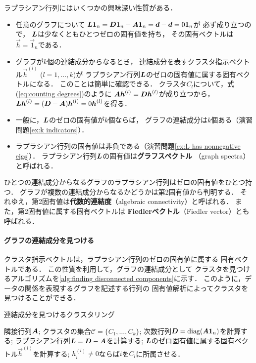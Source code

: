 ラプラシアン行列にはいくつかの興味深い性質がある．
\begin{itemize}
\item
任意のグラフについて
$\mbox{\boldmath $L$}\mbox{\boldmath $1$}_n=\mbox{\boldmath $D$}\mbox{\boldmath $1$}_n-\mbox{\boldmath $A$}\mbox{\boldmath $1$}_n=\mbox{\boldmath $d$}-\mbox{\boldmath $d$}=0\mbox{\boldmath $1$}_n$が
必ず成り立つので，
$\mbox{\boldmath $L$}$は少なくともひとつゼロの固有値を持ち，
その固有ベクトルは$\vec h=\vec 1_n$である．
\item
グラフが$k$個の連結成分からなるとき，
連結成分を表すクラスタ指示ベクトル$\vec h^{(l)}$ ($l=1,\dots,k$)が
ラプラシアン行列$\mbox{\boldmath $L$}$のゼロの固有値に属する固有ベクトルになる．
このことは簡単に確認できる．
クラスタ$C_l$について，式(\ref{eq:counting degrees})のように
$\mbox{\boldmath $A$}\mbox{\boldmath $h$}^{(l)}=\mbox{\boldmath $D$}\mbox{\boldmath $h$}^{(l)}$が成り立つから，
$\mbox{\boldmath $L$}\mbox{\boldmath $h$}^{(l)}=(\mbox{\boldmath $D$}-\mbox{\boldmath $A$})\mbox{\boldmath $h$}^{(l)}=0\mbox{\boldmath $h$}^{(l)}$を得る．
\item
一般に，$\mbox{\boldmath $L$}$のゼロの固有値が$k$個ならば，
グラフの連結成分は$k$個ある（演習問題\ref{ex:k indicators}）．
\item
ラプラシアン行列の固有値は非負である（演習問題\ref{ex:L has nonnegative eigs}）．
ラプラシアン行列$\mbox{\boldmath $L$}$の固有値は{\bf グラフスペクトル}
（graph spectra）と呼ばれる．
\end{itemize}
ひとつの連結成分からなるグラフのラプラシアン行列はゼロの固有値をひとつ持つ．
グラフが複数の連結成分からなるかどうかは第2固有値から判明する．
それゆえ，第2固有値は{\bf 代数的連結度}（algebraic connectivity）と呼ばれる．
また，第2固有値に属する固有ベクトルは
{\bf Fiedlerベクトル}（Fiedler vector）\cite{Fiedler73}とも呼ばれる．




\paragraph{グラフの連結成分を見つける}
クラスタ指示ベクトルは，ラプラシアン行列のゼロの固有値に属する
固有ベクトルである．
この性質を利用して，グラフの連結成分として
クラスタを見つけるアルゴリズムを\ref{alg:finding disconnected components}に示す．
このように，データの関係を表現するグラフを記述する行列の
固有値解析によってクラスタを見つけることができる．


\begin{algorithm}[t]
\caption{連結成分を見つけるクラスタリング}
\label{alg:finding disconnected components}
\begin{algorithmic}[1]
\REQUIRE
隣接行列$\mbox{\boldmath $A$}$;
\ENSURE クラスタの集合$\mathcal{C}=\{ C_1,\dots,C_k \}$;
\STATE
次数行列$\mbox{\boldmath $D$}=\mathop{\textrm{diag}}\nolimits(\mbox{\boldmath $A$}\mbox{\boldmath $1$}_n)$を計算する;
\STATE
ラプラシアン行列$\mbox{\boldmath $L$}=\mbox{\boldmath $D$}-\mbox{\boldmath $A$}$を計算する;
\STATE
$\mbox{\boldmath $L$}$のゼロ固有値に属する固有ベクトル$\vec h^{(l)}$を計算する;
\STATE
$h_i^{(l)}\neq 0$ならば$i$を$C_l$に所属させる．
\end{algorithmic}
\end{algorithm}






